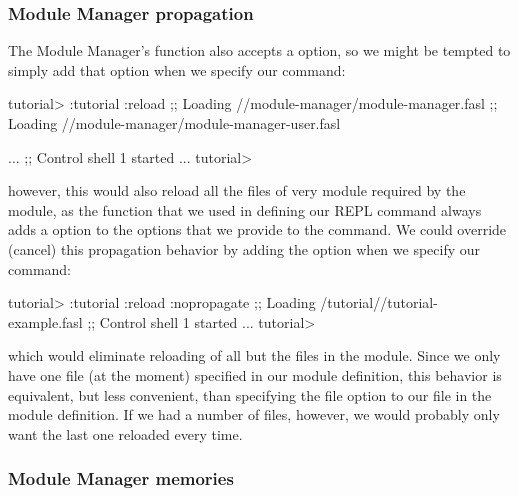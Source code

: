 \documentclass[10pt,twoside,english,pdftex]{article}
\begin{document}
\subsubsection*{Module Manager propagation}

The Module Manager's  function also accepts a
 option, so we might be tempted to simply add that option when
we specify our  command:
%
\W\supp
\begin{example}
\textcolor{darkergray}{%
  tutorial> :tutorial :reload
  ;;   Loading //module-manager/module-manager.fasl
  ;;     Loading
  //module-manager/module-manager-user.fasl

     ...
  ;; Control shell 1 started
     ...
  tutorial>}
\end{example}
%
however, this would also reload all the files of very module required by the
 module, as the  function that
we used in defining our  REPL command always adds a
 option to the options that we provide to the command.
We could override (cancel) this propagation behavior by adding the
 option when we specify our 
command:
%
\W\supp\notpretop
\begin{smallexample}
\textcolor{darkergray}{%
  tutorial> :tutorial :reload :nopropagate
  ;; Loading /tutorial//tutorial-example.fasl
  ;; Control shell 1 started
     ...
  tutorial>}
\end{smallexample}
%
which would eliminate reloading of all but the files in the 
module.  Since we only have one file (at the moment) specified in our
 module definition, this behavior is equivalent, but less
convenient, than specifying the  file option to our
 file in the module definition.  If we had a
number of files, however, we would probably only want the last one reloaded
every time.

\subsubsection*{Module Manager memories}
\end{document}
